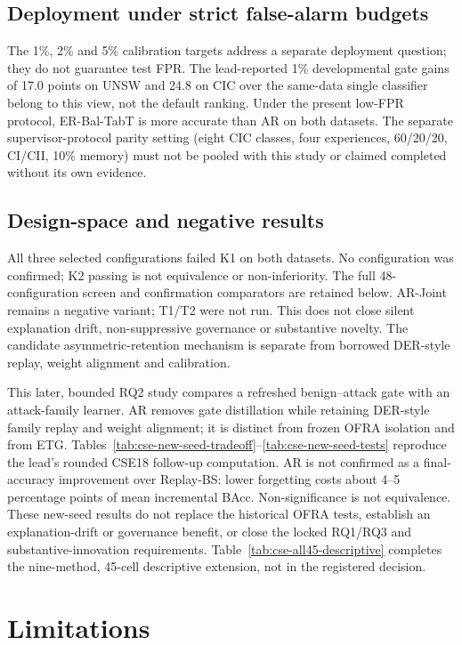 \documentclass[conference]{IEEEtran}
\begin{document}
\subsection{Deployment under strict false-alarm budgets}
The 1\%, 2\% and 5\% calibration targets address a separate deployment question; they do not guarantee test FPR. The lead-reported 1\% developmental gate gains of 17.0 points on UNSW and 24.8 on CIC over the same-data single classifier belong to this view, not the default ranking. Under the present low-FPR protocol, ER-Bal-TabT is more accurate than AR on both datasets. The separate supervisor-protocol parity setting (eight CIC classes, four experiences, 60/20/20, CI/CII, 10\% memory) must not be pooled with this study or claimed completed without its own evidence.
\subsection{Design-space and negative results}
All three selected configurations failed K1 on both datasets. No configuration was confirmed; K2 passing is not equivalence or non-inferiority. The full 48-configuration screen and confirmation comparators are retained below. AR-Joint remains a negative variant; T1/T2 were not run. This does not close silent explanation drift, non-suppressive governance or substantive novelty. The candidate asymmetric-retention mechanism is separate from borrowed DER-style replay, weight alignment and calibration.

This later, bounded RQ2 study compares a refreshed benign--attack gate with an attack-family learner. AR removes gate distillation while retaining DER-style family replay and weight alignment; it is distinct from frozen OFRA isolation and from ETG. Tables~\ref{tab:cse-new-seed-tradeoff}--\ref{tab:cse-new-seed-tests} reproduce the lead's rounded CSE18 follow-up computation. AR is not confirmed as a final-accuracy improvement over Replay-BS: lower forgetting costs about 4--5 percentage points of mean incremental BAcc. Non-significance is not equivalence. These new-seed results do not replace the historical OFRA tests, establish an explanation-drift or governance benefit, or close the locked RQ1/RQ3 and substantive-innovation requirements. Table~\ref{tab:cse-all45-descriptive} completes the nine-method, 45-cell descriptive extension, not in the registered decision.


\section{Limitations}
\label{sec:limits}
\end{document}
